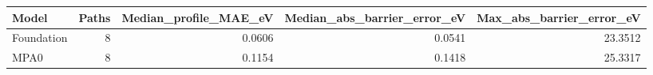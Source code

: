 \begin{tabular}{lrrrr}
\toprule
Model & Paths & Median_profile_MAE_eV & Median_abs_barrier_error_eV & Max_abs_barrier_error_eV \\
\midrule
Foundation & 8 & 0.0606 & 0.0541 & 23.3512 \\
MPA0 & 8 & 0.1154 & 0.1418 & 25.3317 \\
\bottomrule
\end{tabular}

